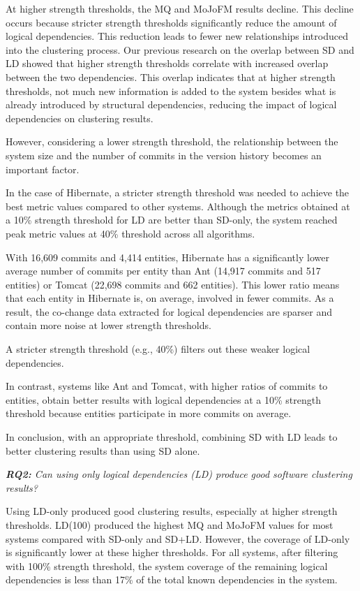 \documentclass{ieeeaccess}
\begin{document}
At higher strength thresholds, the MQ and MoJoFM results decline. This decline occurs because stricter strength thresholds significantly reduce the amount of logical dependencies. This reduction leads to fewer new relationships introduced into the clustering process. Our previous research on the overlap between SD and LD showed that higher strength thresholds correlate with increased overlap between the two dependencies. This overlap indicates that at higher strength thresholds, not much new information is added to the system besides what is already introduced by structural dependencies, reducing the impact of logical dependencies on clustering results.

However, considering a lower strength threshold, the relationship between the system size and the number of commits in the version history becomes an important factor.

In the case of Hibernate, a stricter strength threshold was needed to achieve the best metric values compared to other systems. Although the metrics obtained at a 10\% strength threshold for LD are better than SD-only, the system reached peak metric values at 40\% threshold across all algorithms.

With 16,609 commits and 4,414 entities, Hibernate has a significantly lower average number of commits per entity than Ant (14,917 commits and 517 entities) or Tomcat (22,698 commits and 662 entities). This lower ratio means that each entity in Hibernate is, on average, involved in fewer commits. As a result, the co-change data extracted for logical dependencies are sparser and contain more noise at lower strength thresholds.

A stricter strength threshold (e.g., 40\%) filters out these weaker logical dependencies.

In contrast, systems like Ant and Tomcat, with higher ratios of commits to entities, obtain better results with logical dependencies at a 10\% strength threshold because entities participate in more commits on average.

In conclusion, with an appropriate threshold, combining SD with LD leads to better clustering results than using SD alone.


\textit{\textbf{RQ2:} Can using only logical dependencies (LD) produce good software clustering results?} 

Using LD-only produced good clustering results, especially at higher strength thresholds. LD(100) produced the highest MQ and MoJoFM values for most systems compared with SD-only and SD+LD. However, the coverage of LD-only is significantly lower at these higher thresholds. For all systems, after filtering with 100\% strength threshold, the system coverage of the remaining logical dependencies is less than 17\% of the total known dependencies in the system.
\end{document}
